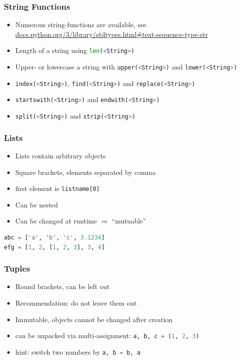 \documentclass[ngerman]{beamer}
\begin{document}
\begin{frame}[containsverbatim]
\frametitle{String Functions}

\begin{itemize}
\item Numerous string-functions are available, see \url{docs.python.org/3/library/stdtypes.html#text-sequence-type-str} 
\item Length of a string using \lstinline[language={Python}]{len(<String>)}
\item Upper- or lowercase a string with \lstinline[language={Python}]{upper(<String>)} and \lstinline[language={Python}]{lower(<String>)}
\item \lstinline[language={Python}]{index(<String>)}, \lstinline[language={Python}]{find(<String>)} and \lstinline[language={Python}]{replace(<String>)}
\item \lstinline[language={Python}]{startswith(<String>)} and \lstinline[language={Python}]{endwith(<String>)}
\item \lstinline[language={Python}]{split(<String>)} and \lstinline[language={Python}]{strip(<String>)}
\end{itemize}

\end{frame}



\begin{frame}[containsverbatim]
\frametitle{Lists}

\begin{itemize}
\item Lists contain arbitrary objects
\item Square brackets, elements separated by comma
\item first element is \texttt{listname[0]}
\item Can be nested
\item Can be changed at runtime $\Rightarrow$ \enquote{mutuable}
\end{itemize}

\begin{lstlisting}[language={Python}]
abc = ['a', 'b', 'c', 3.1234]
efg = [1, 2, [1, 2, 3], 3, 4]
\end{lstlisting}

\end{frame}

\begin{frame}
\frametitle{Tuples}

\begin{itemize}
\item Round brackets, can be left out
\item Recommendation: do not leave them out
\item Immutable, objects cannot be changed after creation
\item can be unpacked via multi-assignment: \lstinline[language={Python}]{a, b, c = (1, 2, 3)}
\item hint: switch two numbers by \lstinline[language={Python}]{a, b = b, a}
\end{itemize}
\end{frame}
\end{document}
